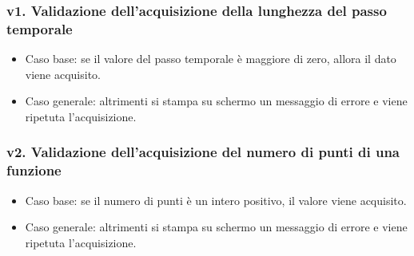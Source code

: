 \subsubsection*{v1. Validazione dell'acquisizione della lunghezza del passo temporale}
\begin{itemize}
\item Caso base: se il valore del passo temporale è maggiore di zero, allora il dato viene acquisito.
\item Caso generale: altrimenti si stampa su schermo un messaggio di errore e viene ripetuta l'acquisizione.
\end{itemize}

\subsubsection*{v2. Validazione dell'acquisizione del numero di punti di una funzione}
\begin{itemize}
\item Caso base: se il numero di punti è un intero positivo, il valore viene acquisito.
\item Caso generale: altrimenti si stampa su schermo un messaggio di errore e viene ripetuta l'acquisizione.
\end{itemize}





